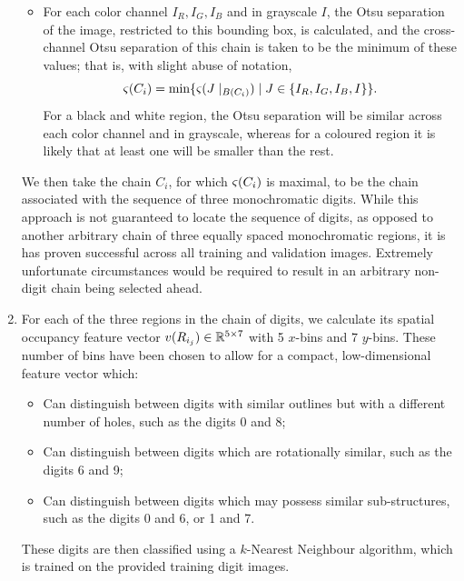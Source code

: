 \documentclass{article}
\begin{document}
\begin{enumerate}
\begin{itemize}
  \item
    For each color channel $I_{R}, I_{G}, I_{B}$ and in grayscale $I$, the Otsu
    separation of the image, restricted to this bounding box, is calculated, and
    the cross-channel Otsu separation of this chain is taken to be the minimum
    of these values; that is, with slight abuse of notation,
    \begin{equation*}
      \varsigma(C_{i})
      =
      \min
      \lbrace
        \varsigma(J\mid_{B(C_{i})})
        \mid
        J
        \in
        \lbrace
          I_{R}
          ,
          I_{G}
          ,
          I_{B}
          ,
          I
        \rbrace
      \rbrace
      .
    \end{equation*}
    For a black and white region, the Otsu separation will be similar across
    each color channel and in grayscale, whereas for a coloured region it is
    likely that at least one will be smaller than the rest.
  \end{itemize}
  We then take the chain $C_{i}$, for which $\varsigma(C_{i})$ is maximal, to
  be the chain associated with the sequence of three monochromatic digits.
  While this approach is not guaranteed to locate the sequence of digits, as
  opposed to another arbitrary chain of three equally spaced monochromatic
  regions, it is has proven successful across all training and validation
  images.
  Extremely unfortunate circumstances would be required to result in an
  arbitrary non-digit chain being selected ahead.

\item
  For each of the three regions in the chain of digits, we calculate its spatial
  occupancy feature vector $v(R_{i_{j}}) \in \mathbb{R}^{5 \times 7}$ with 5
  $x$-bins and 7 $y$-bins.
  These number of bins have been chosen to allow for a compact, low-dimensional
  feature vector which:
  \begin{itemize}
  \item
    Can distinguish between digits with similar outlines but with a different
    number of holes, such as the digits 0 and 8;

  \item
    Can distinguish between digits which are rotationally similar, such as the
    digits 6 and 9;

  \item
    Can distinguish between digits which may possess similar sub-structures,
    such as the digits 0 and 6, or 1 and 7.
  \end{itemize}
  These digits are then classified using a $k$-Nearest Neighbour algorithm,
  which is trained on the provided training digit images.
\end{enumerate}
\end{document}
